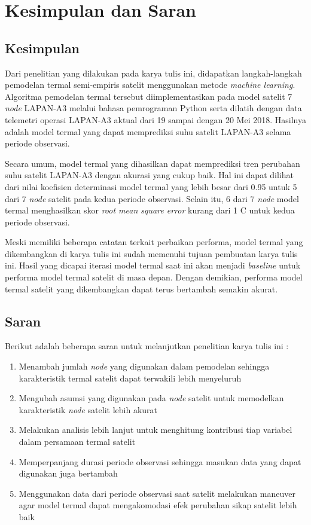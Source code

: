 \chapter{Kesimpulan dan Saran}

\section{Kesimpulan}

Dari penelitian yang dilakukan pada karya tulis ini, didapatkan langkah-langkah
pemodelan termal semi-empiris satelit menggunakan metode \textit{machine
learning}. Algoritma pemodelan termal tersebut diimplementasikan pada model
satelit 7 \textit{node} LAPAN-A3 melalui bahasa pemrograman Python serta
dilatih dengan data telemetri operasi LAPAN-A3 aktual dari 19 sampai dengan 20
Mei 2018. Hasilnya adalah model termal yang dapat memprediksi suhu satelit
LAPAN-A3 selama periode observasi.

Secara umum, model termal yang dihasilkan dapat memprediksi tren perubahan suhu
satelit LAPAN-A3 dengan akurasi yang cukup baik. Hal ini dapat dilihat dari
nilai koefisien determinasi model termal yang lebih besar dari 0.95 untuk 5
dari 7 \textit{node} satelit pada kedua periode observasi. Selain itu, 6 dari 7
\textit{node} model termal menghasilkan skor \textit{root mean square error}
kurang dari 1 \degree C untuk kedua periode observasi.

Meski memiliki beberapa catatan terkait perbaikan performa, model termal yang
dikembangkan di karya tulis ini sudah memenuhi tujuan pembuatan karya tulis
ini. Hasil yang dicapai iterasi model termal saat ini akan menjadi
\textit{baseline} untuk performa model termal satelit di masa depan. Dengan
demikian, performa model termal satelit yang dikembangkan dapat terus bertambah
semakin akurat.

\section{Saran}

Berikut adalah beberapa saran untuk melanjutkan penelitian karya tulis ini :

\begin{enumerate}
\item Menambah jumlah \textit{node} yang digunakan dalam pemodelan sehingga karakteristik termal satelit dapat terwakili lebih menyeluruh
\item Mengubah asumsi yang digunakan pada \textit{node} satelit untuk memodelkan karakteristik \textit{node} satelit lebih akurat
\item Melakukan analisis lebih lanjut untuk menghitung kontribusi tiap variabel dalam persamaan termal satelit
\item Memperpanjang durasi periode observasi sehingga masukan data yang dapat digunakan juga bertambah
\item Menggunakan data dari periode observasi saat satelit melakukan maneuver agar model termal dapat mengakomodasi efek perubahan sikap satelit lebih baik
\end{enumerate}
